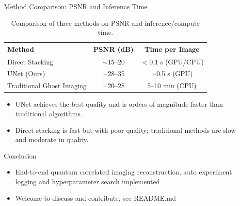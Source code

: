 \documentclass{beamer}
\begin{document}
\begin{frame}{Method Comparison: PSNR and Inference Time}
\begin{table}[]
    \centering
    \begin{tabular}{lcc}
        \hline
        \textbf{Method} & \textbf{PSNR (dB)} & \textbf{Time per Image} \\
        \hline
        Direct Stacking & $\sim$15--20 & $<0.1$ s (GPU/CPU) \\
        UNet (Ours)     & $\sim$28--35 & $\sim$0.5 s (GPU) \\
        Traditional Ghost Imaging & $\sim$20--28 & 5--10 min (CPU) \\
        \hline
    \end{tabular}
    \caption{Comparison of three methods on PSNR and inference/compute time.}
\end{table}
\vspace{0.5em}
\begin{itemize}
    \item UNet achieves the best quality and is orders of magnitude faster than traditional algorithms.
    \item Direct stacking is fast but with poor quality; traditional methods are slow and moderate in quality.
\end{itemize}
\end{frame}

\begin{frame}{Conclusion}
\begin{itemize}
    \item End-to-end quantum correlated imaging reconstruction, auto experiment logging and hyperparameter search implemented
    \item Welcome to discuss and contribute, see README.md
\end{itemize}
\end{frame}
\end{document}
